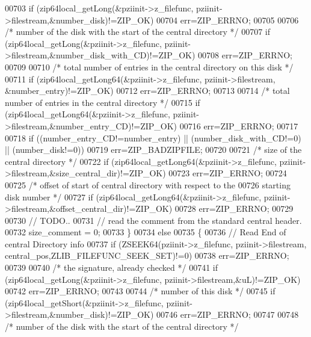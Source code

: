 \begin{DoxyCode}
00703     \textcolor{keywordflow}{if} (zip64local\_getLong(&pziinit->z\_filefunc, pziinit->filestream,&number\_disk)!=ZIP\_OK)
00704       err=ZIP\_ERRNO;
00705 
00706     \textcolor{comment}{/* number of the disk with the start of the central directory */}
00707     \textcolor{keywordflow}{if} (zip64local\_getLong(&pziinit->z\_filefunc, pziinit->filestream,&number\_disk\_with\_CD)!=ZIP\_OK)
00708       err=ZIP\_ERRNO;
00709 
00710     \textcolor{comment}{/* total number of entries in the central directory on this disk */}
00711     \textcolor{keywordflow}{if} (zip64local\_getLong64(&pziinit->z\_filefunc, pziinit->filestream, &number\_entry)!=ZIP\_OK)
00712       err=ZIP\_ERRNO;
00713 
00714     \textcolor{comment}{/* total number of entries in the central directory */}
00715     \textcolor{keywordflow}{if} (zip64local\_getLong64(&pziinit->z\_filefunc, pziinit->filestream,&number\_entry\_CD)!=ZIP\_OK)
00716       err=ZIP\_ERRNO;
00717 
00718     \textcolor{keywordflow}{if} ((number\_entry\_CD!=number\_entry) || (number\_disk\_with\_CD!=0) || (number\_disk!=0))
00719       err=ZIP\_BADZIPFILE;
00720 
00721     \textcolor{comment}{/* size of the central directory */}
00722     \textcolor{keywordflow}{if} (zip64local\_getLong64(&pziinit->z\_filefunc, pziinit->filestream,&size\_central\_dir)!=ZIP\_OK)
00723       err=ZIP\_ERRNO;
00724 
00725     \textcolor{comment}{/* offset of start of central directory with respect to the}
00726 \textcolor{comment}{    starting disk number */}
00727     \textcolor{keywordflow}{if} (zip64local\_getLong64(&pziinit->z\_filefunc, pziinit->filestream,&offset\_central\_dir)!=ZIP\_OK)
00728       err=ZIP\_ERRNO;
00729 
00730     \textcolor{comment}{// TODO..}
00731     \textcolor{comment}{// read the comment from the standard central header.}
00732     size\_comment = 0;
00733   \}
00734   \textcolor{keywordflow}{else}
00735   \{
00736     \textcolor{comment}{// Read End of central Directory info}
00737     \textcolor{keywordflow}{if} (ZSEEK64(pziinit->z\_filefunc, pziinit->filestream, central\_pos,ZLIB\_FILEFUNC\_SEEK\_SET)!=0)
00738       err=ZIP\_ERRNO;
00739 
00740     \textcolor{comment}{/* the signature, already checked */}
00741     \textcolor{keywordflow}{if} (zip64local\_getLong(&pziinit->z\_filefunc, pziinit->filestream,&uL)!=ZIP\_OK)
00742       err=ZIP\_ERRNO;
00743 
00744     \textcolor{comment}{/* number of this disk */}
00745     \textcolor{keywordflow}{if} (zip64local\_getShort(&pziinit->z\_filefunc, pziinit->filestream,&number\_disk)!=ZIP\_OK)
00746       err=ZIP\_ERRNO;
00747 
00748     \textcolor{comment}{/* number of the disk with the start of the central directory */}

\end{DoxyCode}
